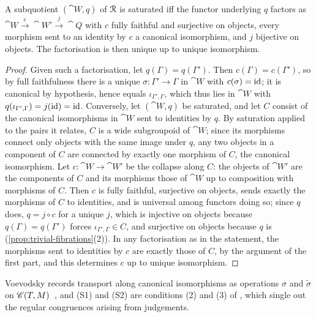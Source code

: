 \begin{lemma}\label{lem:saturated-factorisation}
    A subquotient $(\cat{W}, q)$ of $\mathcal{R}$ is saturated iff the functor underlying $q$ factors as $\cat{W} \xrightarrow{\,c\,} \cat{W}' \xrightarrow{\,j\,} \cat{Q}$ with $c$ fully faithful and surjective on objects, every morphism sent to an identity by $c$ a canonical isomorphism, and $j$ bijective on objects. The factorisation is then unique up to unique isomorphism.
\end{lemma}

\begin{proof}
    Given such a factorisation, let $q(\Gamma) = q(\Gamma')$. Then $c(\Gamma) = c(\Gamma')$, so by full faithfulness there is a unique $\sigma : \Gamma' \to \Gamma$ in $\cat{W}$ with $c(\sigma) = \mathrm{id}$; it is canonical by hypothesis, hence equals $\iota_{\Gamma', \Gamma}$, which thus lies in $\cat{W}$ with $q(\iota_{\Gamma', \Gamma}) = j(\mathrm{id}) = \mathrm{id}$. Conversely, let $(\cat{W}, q)$ be saturated, and let $C$ consist of the canonical isomorphisms in $\cat{W}$ sent to identities by $q$. By saturation applied to the pairs it relates, $C$ is a wide subgroupoid of $\cat{W}$; since its morphisms connect only objects with the same image under $q$, any two objects in a component of $C$ are connected by exactly one morphism of $C$, the canonical isomorphism. Let $c : \cat{W} \to \cat{W}'$ be the collapse along $C$: the objects of $\cat{W}'$ are the components of $C$ and its morphisms those of $\cat{W}$ up to composition with morphisms of $C$. Then $c$ is fully faithful, surjective on objects, sends exactly the morphisms of $C$ to identities, and is universal among functors doing so; since $q$ does, $q = j \circ c$ for a unique $j$, which is injective on objects because $q(\Gamma) = q(\Gamma')$ forces $\iota_{\Gamma', \Gamma} \in C$, and surjective on objects because $q$ is (\cref{prop:trivial-fibrations}(2)). In any factorisation as in the statement, the morphisms sent to identities by $c$ are exactly those of $C$, by the argument of the first part, and this determines $c$ up to unique isomorphism.
\end{proof}

\begin{remark}\label{rem:saturated}
    Voevodsky records transport along canonical isomorphisms as operations $\sigma$ and $\tilde\sigma$ on $\mathscr{C}(T, M)$~\cite[\S5]{Voevodsky2014Module}, and (S1) and (S2) are conditions (2) and (3) of \cite[Prop.~6.11]{Voevodsky2014Module}, which single out the regular congruences arising from judgements.
\end{remark}

